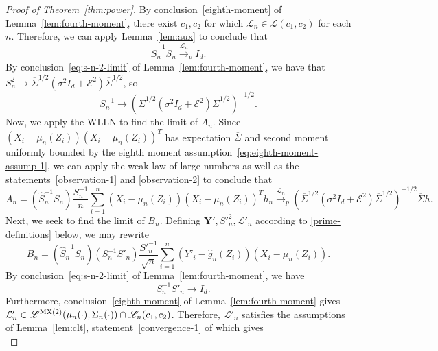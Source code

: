 \documentclass[ejs]{imsart}
\numberwithin{equation}{section}
\theoremstyle{plain}
\theoremstyle{definition}
\theoremstyle{remark}
\newcommand{\srx}{X}
\newcommand{\srz}{Z}
\newcommand{\pry}{{\bm Y}}
\begin{document}
\begin{proof}[Proof of Theorem~\ref{thm:power}]
	By conclusion~\eqref{eighth-moment} of Lemma~\ref{lem:fourth-moment}, there exist $c_1, c_2$ for which $\mathcal L_n \in \mathscr L(c_1, c_2)$ for each $n$. Therefore, we can apply Lemma~\ref{lem:aux} to conclude that 
	\begin{equation}
		\widehat S_n^{-1}S_n  \overset{\mathcal L_n}\rightarrow_p I_d. 
		\label{observation-1}
	\end{equation}
	By conclusion~\eqref{eq:s-n-2-limit} of Lemma~\ref{lem:fourth-moment}, we have that $S_n^2 \rightarrow \overline \Sigma^{1/2}(\sigma^2 I_d + \mathcal E^2)\overline \Sigma^{1/2}$, so 
	\begin{equation}
		S_n^{-1} \rightarrow (\overline \Sigma^{1/2}(\sigma^2 I_d + \mathcal E^2)\overline \Sigma^{1/2})^{-1/2}.
		\label{observation-2}
	\end{equation} 
	Now, we apply the WLLN to find the limit of $A_n$. Since $(\srx_i - \mu_n(\srz_i))(X_i - \mu_n(Z_i))^T$ has expectation $\overline \Sigma$ and second moment uniformly bounded by the eighth moment assumption~\eqref{eq:eighth-moment-assump-1}, we can apply the weak law of large numbers as well as the statements~\eqref{observation-1} and \eqref{observation-2} to conclude that
	\begin{equation*}
		A_n = (\widehat S^{-1}_nS_n)\frac{S_n^{-1}}{n}\sum_{i = 1}^n (\srx_i - \mu_n(\srz_i))(X_i - \mu_n(Z_i))^T h_n \overset{\mathcal L_n}\rightarrow_p (\overline \Sigma^{1/2}(\sigma^2 I_d + \mathcal E^2)\overline \Sigma^{1/2})^{-1/2}\overline \Sigma h.
	\end{equation*}
	Next, we seek to find the limit of $B_n$. Defining $\pry', S'^2_n, \mathcal L'_n$ according to \eqref{prime-definitions} below, we may rewrite
	\begin{equation}
		B_n = (\widehat S_n^{-1}S_n)(S_n^{-1}S'_n)\frac{S'^{-1}_n}{\sqrt{n}}\sum_{i = 1}^n (Y'_i - \widehat g_n(Z_i))(\srx_i - \mu_n(\srz_i)).
	\end{equation}
	By conclusion~\eqref{eq:s-n-2-limit} of Lemma~\ref{lem:fourth-moment}, we have
	\begin{equation}
		\quad S_n^{-1}S'_n \rightarrow I_d.
		\label{display-1}
	\end{equation}
	Furthermore, conclusion~\eqref{eighth-moment} of Lemma~\ref{lem:fourth-moment} gives $\mathcal L'_n \in \mathscr L^{\textnormal{MX(2)}}(\mu_n(\cdot), \Sigma_n(\cdot)) \cap \mathscr L_n(c_1, c_2)$. Therefore, $\mathcal L'_n$ satisfies the assumptions of Lemma~\ref{lem:clt}, statement~\eqref{convergence-1} of which gives
	\begin{equation}

\end{equation}
\end{proof}
\end{document}
